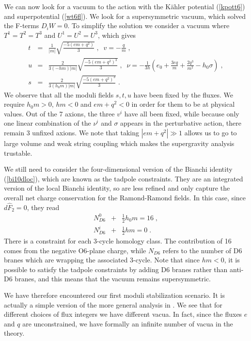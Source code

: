 \documentclass[11pt,a4paper]{article}
\numberwithin{equation}{section}
\numberwithin{table}{section}\setlength{\multlinegap}{25pt}
\newcommand{\bea}{\begin{eqnarray}}  \newcommand{\eea}{\end{eqnarray}}
\newcommand{\nn}{\nonumber}
\begin{document}
We can now look for a vacuum to the action with the K{\"a}hler potential (\ref{kpott6}) and superpotential (\ref{wt6fl}). We look for a supersymmetric vacuum, which solved the F-terms $D_i W=0$. To simplify the solution we consider a vacuum where $T^1=T^2=T^3$ and $U^1=U^2=U^3$, which gives \cite{Camara:2005dc}
\bea
t &=& \frac{1}{|m|}\sqrt{\frac{-5\left(e m + q^2 \right)}{3}}\;, \;\; v= -\frac{q}{m}\;, \nn \\
u  &=&  \frac{2}{3\left(-hm\right)|m|}\sqrt{\frac{-5\left(e m + q^2 \right)^3}{3}}\;, \;\; \nu= -\frac{1}{3h} \left(e_0 + \frac{3 e q}{m} +\frac{2 q^3}{m^2}- h_0 \sigma \right) \;, \nn \\
s &=& \frac{2}{3\left(h_0m\right)|m|}\sqrt{\frac{-5\left(e m + q^2 \right)^3}{3}}\;.
\label{solt6flux}
\eea
We observe that all the moduli fields $s,t,u$ have been fixed by the fluxes. We require $h_0 m > 0$, $h m <0$ and $e m + q^2 < 0$ in order for them to be at physical values. Out of the 7 axions, the three $v^i$ have all been fixed, while because only one linear combination of the $\nu^i$ and $\sigma$ appears in the perturbative action, there remain 3 unfixed axions. We note that taking $\left|e m + q^2\right| \gg 1$ allows us to go to large volume and weak string coupling which makes the supergravity analysis trustable. 

We still need to consider the four-dimensional version of the Bianchi identity (\ref{bi10dloc}), which are known as the tadpole constraints. They are an integrated version of the local Bianchi identity, so are less refined and only capture the overall net charge conservation for the Ramond-Ramond fields. In this case, since $d\hat{F}_2=0$, they read
\bea
N^0_{D6} &+& \frac12 h_0 m = 16 \;, \nn \\
N^i_{D6} &+& \frac12 h m = 0 \;.
\eea
There is a constraint for each 3-cycle homology class. The contribution of 16 comes from the negative O6-plane charge, while $N_{D6}$ refers to the number of D6 branes which are wrapping the associated 3-cycle. Note that since $h m < 0$, it is possible to satisfy the tadpole constraints by adding D6 branes rather than anti-D6 branes, and this means that the vacuum remains supersymmetric. 

We have therefore encountered our first moduli stabilization scenario. It is actually a simple version of the more general analysis in \cite{DeWolfe:2005uu}. We see that for different choices of flux integers we have different vacua. In fact, since the fluxes $e$ and $q$ are unconstrained, we have formally an infinite number of vacua in the theory. 
\end{document}
